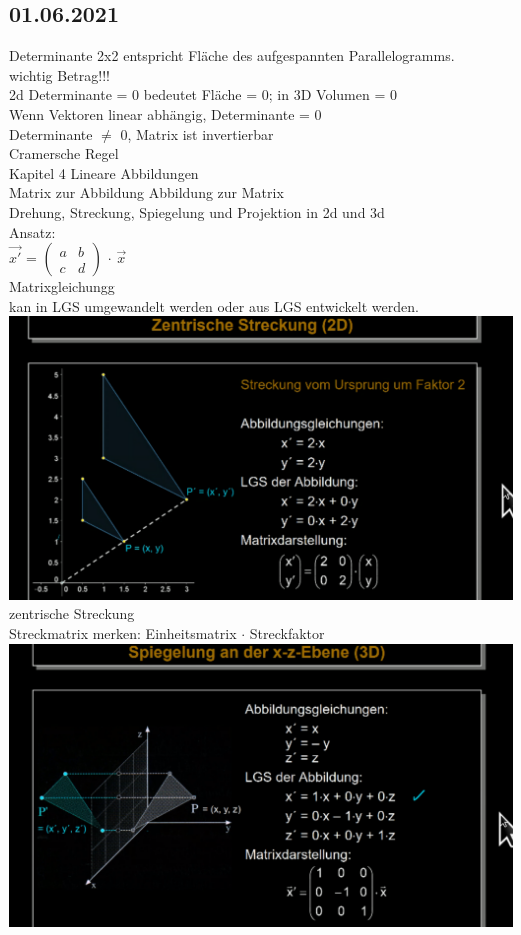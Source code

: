 \documentclass{article}
\begin{document}
	\subsection*{01.06.2021}
	Determinante 2x2 entspricht Fläche des aufgespannten Parallelogramms. \\
	wichtig Betrag!!! \\
	2d Determinante = 0 bedeutet Fläche = 0; in 3D Volumen = 0 \\
	Wenn Vektoren linear abhängig, Determinante = 0 \\
	Determinante $\neq$ 0, Matrix ist invertierbar \\
	Cramersche Regel \\
	Kapitel 4 Lineare Abbildungen \\
	Matrix zur Abbildung Abbildung zur Matrix  \\
	Drehung, Streckung, Spiegelung  und Projektion in 2d und 3d \\
	Ansatz: \\
	$\vec{x'}$ = $\left(\begin{array}{cc}
	a & b \\ c & d
	\end{array}\right)$ $\cdot$
	$\vec{x}$ \\
	Matrixgleichungg \\
	kan in LGS umgewandelt werden oder aus LGS entwickelt werden. \\
	\includegraphics[width=\linewidth]{zstreckung} \\
	zentrische Streckung \\
	Streckmatrix merken: Einheitsmatrix $\cdot$ Streckfaktor \\
	\includegraphics[width=\linewidth]{zes} \\
\end{document}
